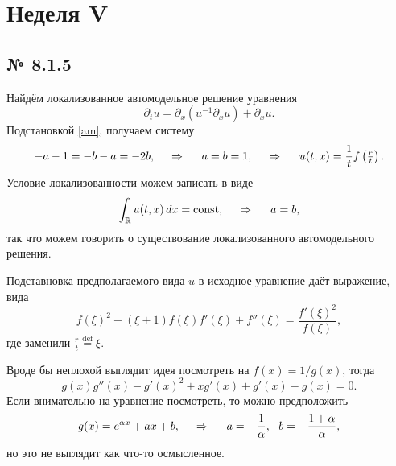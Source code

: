 \section{Неделя V}

\subsection*{№ 8.1.5}

Найдём локализованное автомодельное решение уравнения
\begin{equation*}
	\partial_t u = \partial_x (u^{-1} \partial_x u) + \partial_x u.
\end{equation*}
Подстановкой \eqref{am}, получаем систему
\begin{equation*}
	-a -1 = -b-a = -2 b,
	\hspace{0.5cm} \Rightarrow \hspace{0.5cm}
	a = b = 1,
	\hspace{0.5cm} \Rightarrow \hspace{0.5cm}
	u(t, x) = \frac{1}{t} f\left(\tfrac{r}{t}\right).
\end{equation*}
Условие локализованности можем записать в виде
\begin{equation*}
	\int_{\mathbb{R}} u(t, x) \, d x = \textnormal{const}, 
	\hspace{0.5cm} \Rightarrow \hspace{0.5cm}
	a = b,
\end{equation*}
так что можем говорить о существование локализованного автомодельного решения. 


Подставновка предполагаемого вида $u$ в исходное уравнение даёт выражение, вида
\begin{equation*}
	f(\xi)^2 + (\xi + 1) f(\xi) f'(\xi) + f''(\xi) = \frac{f'(\xi)^2}{f(\xi)},
\end{equation*}
где заменили $\frac{r}{t} \overset{\mathrm{def}}{=}  \xi$.

Вроде бы неплохой выглядит идея посмотреть на $f(x) = 1/g(x)$, тогда
\begin{equation*}
	g(x) g''(x)-g'(x)^2+x g'(x)+g'(x)-g(x) = 0.
\end{equation*}
Если внимательно на уравнение посмотреть, то можно предположить
\begin{equation*}
	g(x) = e^{\alpha x} + a x + b,
	\hspace{0.5cm} \Rightarrow \hspace{0.5cm}
	a = - \frac{1}{\alpha},
	\ \ 
	b = - \frac{1 + \alpha}{\alpha},
\end{equation*}
но это не выглядит как что-то осмысленное.




